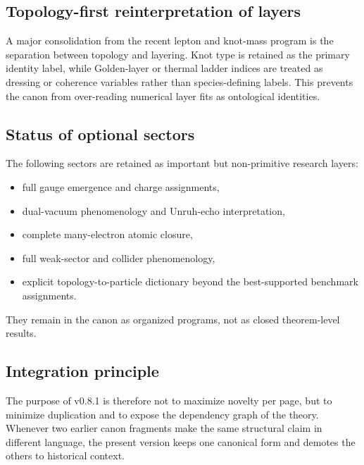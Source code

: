 \documentclass[11pt]{article}
\theoremstyle{definition}
\theoremstyle{plain}
\theoremstyle{remark}
\begin{document}
    \subsection{Topology-first reinterpretation of layers}
        A major consolidation from the recent lepton and knot-mass program is the separation between topology and layering. Knot type is retained as the primary identity label, while Golden-layer or thermal ladder indices are treated as dressing or coherence variables rather than species-defining labels. This prevents the canon from over-reading numerical layer fits as ontological identities.

    \subsection{Status of optional sectors}
        The following sectors are retained as important but non-primitive research layers:
        \begin{itemize}
            \item full gauge emergence and charge assignments,
            \item dual-vacuum phenomenology and Unruh-echo interpretation,
            \item complete many-electron atomic closure,
            \item full weak-sector and collider phenomenology,
            \item explicit topology-to-particle dictionary beyond the best-supported benchmark assignments.
        \end{itemize}
        They remain in the canon as organized programs, not as closed theorem-level results.

    \subsection{Integration principle}
        The purpose of v0.8.1 is therefore not to maximize novelty per page, but to minimize duplication and to expose the dependency graph of the theory. Whenever two earlier canon fragments make the same structural claim in different language, the present version keeps one canonical form and demotes the others to historical context.
\end{document}
